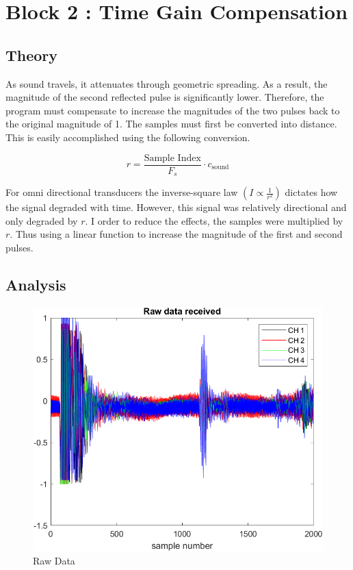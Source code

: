 \section{Block 2 : Time Gain Compensation}

    \subsection{Theory}
    As sound travels, it attenuates through geometric spreading.  As a result, the magnitude of the second reflected pulse is significantly lower. Therefore, the program must compensate to increase the magnitudes of the two pulses back to the original magnitude of 1. 
    The samples must first be converted into distance. This is easily accomplished using the following conversion.
    
    \begin{equation}
        r = \frac{\text{Sample Index}}{F_s} \cdot c_{\text{sound}}
        \label{eq:distanceTGC}
    \end{equation}
    
    

    For omni directional transducers the inverse-square law $(I \propto  \frac{1} {r^2} )$ dictates how the signal degraded with time. However, this signal was relatively directional and only degraded by $r$. I order to reduce the effects, the samples were multiplied by $r$. Thus using a linear function to increase the magnitude of the first and second pulses.  


    \subsection{Analysis}

    \begin{figure}[H]
        \centering
        \includegraphics[width=0.5\linewidth]{figures/rawData.png}
        \caption{Raw Data}
        \label{fig:raw_data}
    \end{figure}


